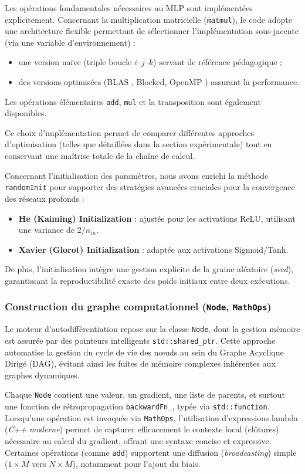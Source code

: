 \documentclass[a4paper,11pt]{article}
\begin{document}
Les opérations fondamentales nécessaires au MLP sont implémentées explicitement. Concernant la multiplication matricielle (\texttt{matmul}), le code adopte une architecture flexible permettant de sélectionner l'implémentation sous-jacente (via une variable d'environnement) :
\begin{itemize}
  \item une version naïve (triple boucle $i$--$j$--$k$) servant de référence pédagogique ;
  \item des versions optimisées (BLAS \cite{blas}, Blocked, OpenMP \cite{openmp}) assurant la performance.
\end{itemize}
Les opérations élémentaires \texttt{add}, \texttt{mul} et la transposition sont également disponibles.

Ce choix d'implémentation permet de comparer différentes approches d'optimisation (telles que détaillées dans la section expérimentale) tout en conservant une maîtrise totale de la chaîne de calcul.

Concernant l'initialisation des paramètres, nous avons enrichi la méthode \texttt{randomInit} pour supporter des stratégies avancées cruciales pour la convergence des réseaux profonds :
\begin{itemize}
    \item \textbf{He (Kaiming) Initialization} : ajustée pour les activations ReLU, utilisant une variance de $2/n_{in}$.
    \item \textbf{Xavier (Glorot) Initialization} : adaptée aux activations Sigmoid/Tanh.
\end{itemize}
De plus, l'initialisation intègre une gestion explicite de la graine aléatoire (\textit{seed}), garantissant la reproductibilité exacte des poids initiaux entre deux exécutions.

\subsubsection{Construction du graphe computationnel (\texttt{Node}, \texttt{MathOps})}
Le moteur d'autodifférentiation repose sur la classe \texttt{Node}, dont la gestion mémoire est assurée par des pointeurs intelligents \texttt{std::shared\_ptr}. Cette approche automatise la gestion du cycle de vie des nœuds au sein du Graphe Acyclique Dirigé (DAG), évitant ainsi les fuites de mémoire complexes inhérentes aux graphes dynamiques.

Chaque \texttt{Node} contient une valeur, un gradient, une liste de parents, et surtout une fonction de rétropropagation \texttt{backwardFn\_}, typée via \texttt{std::function}. Lorsqu'une opération est invoquée via \texttt{MathOps}, l'utilisation d'expressions lambda (\emph{C++ moderne}) permet de capturer efficacement le contexte local (clôtures) nécessaire au calcul du gradient, offrant une syntaxe concise et expressive. Certaines opérations (comme \texttt{add}) supportent une diffusion (\textit{broadcasting}) simple ($1 \times M$ vers $N \times M$), notamment pour l'ajout du biais.
\end{document}
